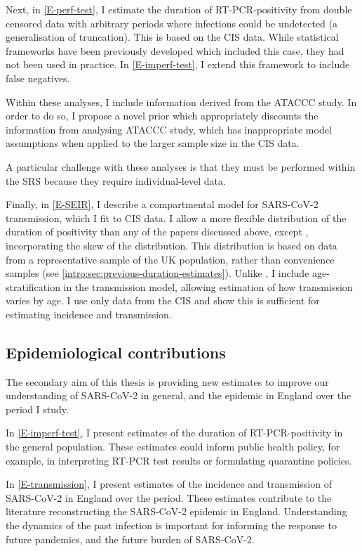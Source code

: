 \documentclass[thesis.tex]{subfiles}
\begin{document}
Next, in \cref{E-perf-test}, I estimate the duration of RT-PCR-positivity from double censored data with arbitrary periods where infections could be undetected (a generalisation of truncation).
This is based on the CIS data.
While statistical frameworks have been previously developed which included this case, they had not been used in practice.
In \cref{E-imperf-test}, I extend this framework to include false negatives.

Within these analyses, I include information derived from the ATACCC study.
In order to do so, I propose a novel prior which appropriately discounts the information from analysing ATACCC study, which has inappropriate model assumptions when applied to the larger sample size in the CIS data.

A particular challenge with these analyses is that they must be performed within the SRS because they require individual-level data.


Finally, in \cref{E-SEIR}, I describe a compartmental model for SARS-CoV-2 transmission, which I fit to CIS data.
I allow a more flexible distribution of the duration of positivity than any of the papers discussed above, except \textcite{nicholsonImproving}, incorporating the skew of the distribution.
This distribution is based on data from a representative sample of the UK population, rather than convenience samples (see \cref{intro:sec:previous-duration-estimates}).
Unlike \textcite{nicholsonImproving}, I include age-stratification in the transmission model, allowing estimation of how transmission varies by age.
I use only data from the CIS and show this is sufficient for estimating incidence and transmission.

\subsection{Epidemiological contributions}

The secondary aim of this thesis is providing new estimates to improve our understanding of SARS-CoV-2 in general, and the epidemic in England over the period I study.

In \cref{E-imperf-test}, I present estimates of the duration of RT-PCR-positivity in the general population.
These estimates could inform public health policy, for example, in interpreting RT-PCR test results or formulating quarantine policies.

In \cref{E-transmission}, I present estimates of the incidence and transmission of SARS-CoV-2 in England over the period.
These estimates contribute to the literature reconstructing the SARS-CoV-2 epidemic in England.
Understanding the dynamics of the past infection is important for informing the response to future pandemics, and the future burden of SARS-CoV-2.
\end{document}
